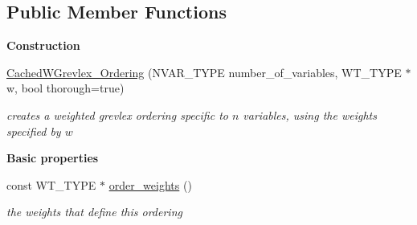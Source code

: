\subsection*{Public Member Functions}
\begin{Indent}\textbf{ Construction}\par
\begin{DoxyCompactItemize}
\item 
\hyperlink{class_cached_w_grevlex___ordering_a107617c77aaebe5ba74973af66ab75b6}{Cached\+W\+Grevlex\+\_\+\+Ordering} (N\+V\+A\+R\+\_\+\+T\+Y\+PE number\+\_\+of\+\_\+variables, W\+T\+\_\+\+T\+Y\+PE $\ast$w, bool thorough=true)
\begin{DoxyCompactList}\small\item\em creates a weighted grevlex ordering specific to $n$ variables, using the weights specified by $w$ \end{DoxyCompactList}\end{DoxyCompactItemize}
\end{Indent}
\begin{Indent}\textbf{ Basic properties}\par
\begin{DoxyCompactItemize}
\item 
\mbox{\label{class_cached_w_grevlex___ordering_a845bb3c810fd284346de246f895ba763}} 
const W\+T\+\_\+\+T\+Y\+PE $\ast$ \hyperlink{class_cached_w_grevlex___ordering_a845bb3c810fd284346de246f895ba763}{order\+\_\+weights} ()
\begin{DoxyCompactList}\small\item\em the weights that define this ordering \end{DoxyCompactList}\end{DoxyCompactItemize}
\end{Indent}
